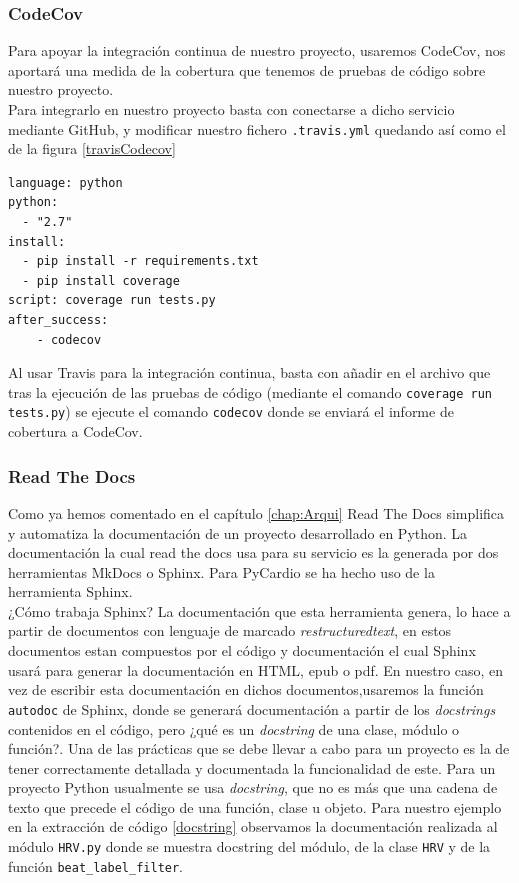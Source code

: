\subsubsection*{CodeCov}
\label{subsubsec:CodeCov}
Para apoyar la integración continua de nuestro proyecto, usaremos CodeCov, nos aportará una medida de la cobertura que tenemos de pruebas de código sobre nuestro proyecto. \\
Para integrarlo en nuestro proyecto basta con conectarse a dicho servicio mediante GitHub, y modificar nuestro fichero \texttt{.travis.yml} quedando así como el de la figura \ref{travisCodecov}

\begin{lstlisting}[caption={\texttt{.travis.yml} para integrar CodeCov},label=travisCodecov]
language: python
python:
  - "2.7"
install:
  - pip install -r requirements.txt
  - pip install coverage
script: coverage run tests.py
after_success:
    - codecov
\end{lstlisting}

Al usar Travis para la integración continua, basta con añadir en el archivo que tras la ejecución de las pruebas de código (mediante el comando \texttt{coverage run tests.py}) se ejecute el comando \texttt{codecov} donde se enviará el informe de cobertura a CodeCov. 

\subsubsection*{Read The Docs}
\label{subusub:rtd}
Como ya hemos comentado en el capítulo \ref{chap:Arqui} Read The Docs simplifica y automatiza la documentación de un proyecto desarrollado en Python. La documentación la cual read the docs usa para su servicio es la generada por dos herramientas MkDocs o Sphinx. Para PyCardio se ha hecho uso de la herramienta Sphinx. \\
¿Cómo trabaja Sphinx? La documentación que esta herramienta genera, lo hace a partir de documentos con lenguaje de marcado \textit{restructuredtext}, en estos documentos estan compuestos por el código y documentación el cual Sphinx usará para generar la documentación en HTML, epub o pdf. En nuestro caso, en vez de escribir esta documentación en dichos documentos,usaremos la función \texttt{autodoc} de Sphinx, donde se generará documentación a partir de los \textit{docstrings} contenidos en el código, pero ¿qué es un \textit{docstring} de una clase, módulo o función?. Una de las prácticas que se debe llevar a cabo para un proyecto es la de tener correctamente detallada y documentada la funcionalidad de este. Para un proyecto Python usualmente se usa \textit{docstring}, que no es más que una cadena de texto que precede el código de una función, clase u objeto. Para nuestro ejemplo en la extracción de código \ref{docstring} observamos la documentación realizada al módulo \texttt{HRV.py} donde se muestra docstring del módulo, de la clase \texttt{HRV} y de la función \texttt{beat\_label\_filter}.

